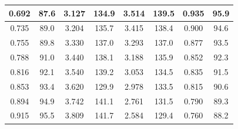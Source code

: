 \documentclass[a4paper,12pt,titlepage]{article}
\begin{document}
\begin{table}[]
\begin{tabular}{|cccccccc}
\multicolumn{1}{|c|}{0.692}       & \multicolumn{1}{c|}{87.6}               & \multicolumn{1}{c|}{3.127}       & \multicolumn{1}{c|}{134.9}              & \multicolumn{1}{c|}{3.514}       & \multicolumn{1}{c|}{139.5}              & \multicolumn{1}{c|}{0.935}       & \multicolumn{1}{c|}{95.9}               \\ \hline
\multicolumn{1}{|c|}{0.735}       & \multicolumn{1}{c|}{89.0}               & \multicolumn{1}{c|}{3.204}       & \multicolumn{1}{c|}{135.7}              & \multicolumn{1}{c|}{3.415}       & \multicolumn{1}{c|}{138.4}              & \multicolumn{1}{c|}{0.900}       & \multicolumn{1}{c|}{94.6}               \\ \hline
\multicolumn{1}{|c|}{0.755}       & \multicolumn{1}{c|}{89.8}               & \multicolumn{1}{c|}{3.330}       & \multicolumn{1}{c|}{137.0}              & \multicolumn{1}{c|}{3.293}       & \multicolumn{1}{c|}{137.0}              & \multicolumn{1}{c|}{0.877}       & \multicolumn{1}{c|}{93.5}               \\ \hline
\multicolumn{1}{|c|}{0.788}       & \multicolumn{1}{c|}{91.0}               & \multicolumn{1}{c|}{3.440}       & \multicolumn{1}{c|}{138.1}              & \multicolumn{1}{c|}{3.188}       & \multicolumn{1}{c|}{135.9}              & \multicolumn{1}{c|}{0.852}       & \multicolumn{1}{c|}{92.3}               \\ \hline
\multicolumn{1}{|c|}{0.816}       & \multicolumn{1}{c|}{92.1}               & \multicolumn{1}{c|}{3.540}       & \multicolumn{1}{c|}{139.2}              & \multicolumn{1}{c|}{3.053}       & \multicolumn{1}{c|}{134.5}              & \multicolumn{1}{c|}{0.835}       & \multicolumn{1}{c|}{91.5}               \\ \hline
\multicolumn{1}{|c|}{0.853}       & \multicolumn{1}{c|}{93.4}               & \multicolumn{1}{c|}{3.620}       & \multicolumn{1}{c|}{129.9}              & \multicolumn{1}{c|}{2.978}       & \multicolumn{1}{c|}{133.5}              & \multicolumn{1}{c|}{0.815}       & \multicolumn{1}{c|}{90.6}               \\ \hline
\multicolumn{1}{|c|}{0.894}       & \multicolumn{1}{c|}{94.9}               & \multicolumn{1}{c|}{3.742}       & \multicolumn{1}{c|}{141.1}              & \multicolumn{1}{c|}{2.761}       & \multicolumn{1}{c|}{131.5}              & \multicolumn{1}{c|}{0.790}       & \multicolumn{1}{c|}{89.3}               \\ \hline
\multicolumn{1}{|c|}{0.915}       & \multicolumn{1}{c|}{95.5}               & \multicolumn{1}{c|}{3.809}       & \multicolumn{1}{c|}{141.7}              & \multicolumn{1}{c|}{2.584}       & \multicolumn{1}{c|}{129.4}              & \multicolumn{1}{c|}{0.760}       & \multicolumn{1}{c|}{88.2}               \\ \hline

\end{tabular}
\end{table}
\end{document}
